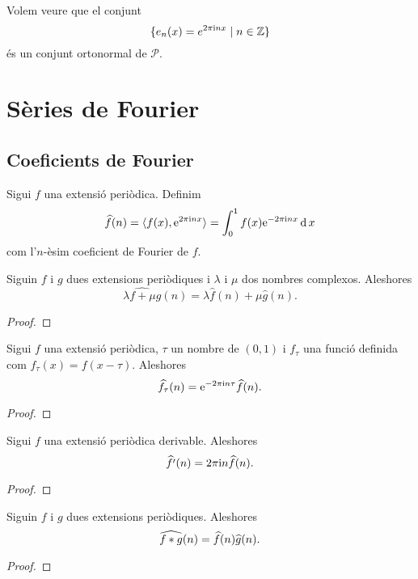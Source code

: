 \documentclass[../../Main.tex]{subfiles}
\begin{document}
	\begin{example}
		\label{ex:base ortonormal de les extensions periòdiques}
		Volem veure que el conjunt
		\[\{e_{n}(x)=e^{2\pi\mathrm{i} nx}\mid n\in\mathbb{Z}\}\]
		és un conjunt ortonormal de \(\mathcal{P}\).
		\begin{solution}
		\end{solution}
	\end{example}
\section{Sèries de Fourier}
	\subsection{Coeficients de Fourier}
	\begin{definition}
		\label{def:coeficients de Fourier}
		Sigui \(f\) una extensió periòdica. Definim
		\[\widehat{f}(n)=\langle f(x),\mathrm{e}^{2\pi\mathrm{i} nx}\rangle=\int_{0}^{1}f(x)\mathrm{e}^{-2\pi\mathrm{i} nx}\operatorname{d} x\]
		com l'\(n\)-èsim coeficient de Fourier de \(f\).
	\end{definition}
	\begin{proposition}
		Siguin \(f\) i \(g\) dues extensions periòdiques i \(\lambda\) i \(\mu\) dos nombres complexos. Aleshores
		\[\widehat{\lambda f+\mu g}(n)=\lambda\widehat{f}(n)+\mu\widehat{g}(n).\]
		\begin{proof}
		\end{proof}
	\end{proposition}
	\begin{proposition}
		Sigui \(f\) una extensió periòdica, \(\tau\) un nombre de \((0,1)\) i \(f_{\tau}\) una funció definida com \(f_{\tau}(x)=f(x-\tau)\). Aleshores
		\[\widehat{f_{\tau}}(n)=\mathrm{e}^{-2\pi\mathrm{i} n\tau}\widehat{f}(n).\]
		\begin{proof}
		\end{proof}
	\end{proposition}
	\begin{proposition}
		Sigui \(f\) una extensió periòdica derivable. Aleshores
		\[\widehat{f'}(n)=2\pi\mathrm{i} n\widehat{f}(n).\]
		\begin{proof}
		\end{proof}
	\end{proposition}
	\begin{proposition}
		Siguin \(f\) i \(g\) dues extensions periòdiques. Aleshores
		\[\widehat{f\mathbin{\ast} g}(n)=\widehat{f}(n)\widehat{g}(n).\]
		\begin{proof}
		\end{proof}
	\end{proposition}
\end{document}
